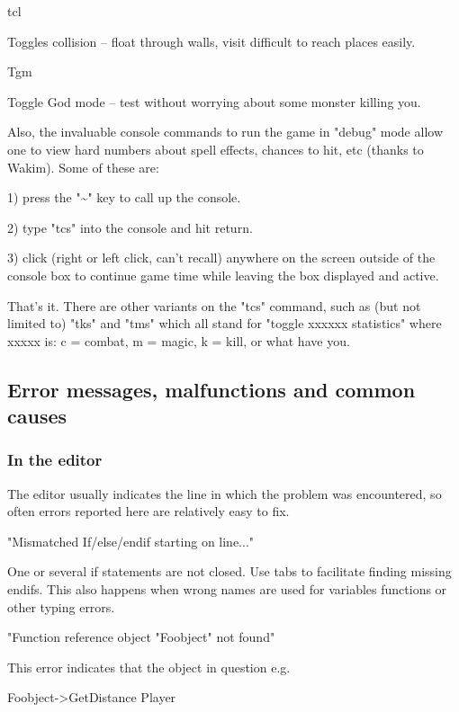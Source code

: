 tcl

Toggles collision -- float through walls, visit difficult to reach
places easily.

Tgm

Toggle God mode -- test without worrying about some monster killing you.

Also, the invaluable console commands to run the game in "debug" mode
allow one to view hard numbers about spell effects, chances to hit, etc
(thanks to Wakim). Some of these are:

1) press the "\textasciitilde" key to call up the console.

2) type "tcs" into the console and hit return.

3) click (right or left click, can't recall) anywhere on the screen
outside of the console box to continue game time while leaving the box
displayed and active.

That's it. There are other variants on the "tcs" command, such as (but
not limited to) "tks" and "tms" which all stand for "toggle xxxxxx
statistics" where xxxxx is: c = combat, m = magic, k = kill, or what
have you.

\hypertarget{error-messages-malfunctions-and-common-causes}{%
\subsection{Error messages, malfunctions and common
causes}\label{error-messages-malfunctions-and-common-causes}}

\hypertarget{in-the-editor}{%
\subsubsection{In the editor}\label{in-the-editor}}

The editor usually indicates the line in which the problem was
encountered, so often errors reported here are relatively easy to fix.

"Mismatched If/else/endif starting on line..."

One or several if statements are not closed. Use tabs to facilitate
finding missing endifs. This also happens when wrong names are used for
variables functions or other typing errors.

"Function reference object "Foobject" not found"

This error indicates that the object in question e.g.

Foobject-\textgreater GetDistance Player

